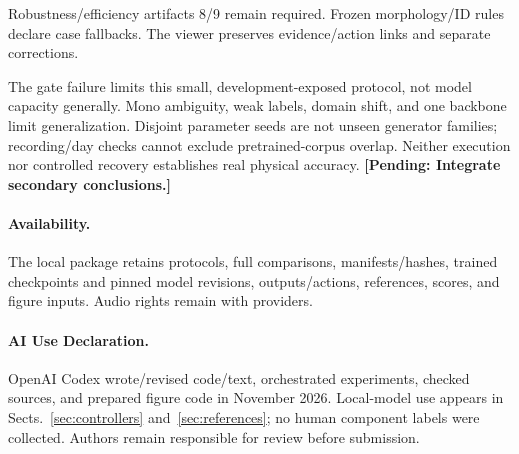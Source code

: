 \documentclass[runningheads,orivec]{llncs}
\newcommand{\pending}[1]{\iffinalresults
  \PackageError{research-results}{Unresolved result or protocol marker}{Resolve the marked item from recorded evidence before submission.}%
  \else\textbf{[Pending: #1]}\fi}
\newif\iffinalresults
\begin{document}
Robustness/efficiency artifacts 8/9 remain required. Frozen morphology/ID rules declare case fallbacks. The viewer preserves evidence/action links and separate corrections.

The gate failure limits this small, development-exposed protocol, not model capacity generally. Mono ambiguity, weak labels, domain shift, and one backbone limit generalization. Disjoint parameter seeds are not unseen generator families; recording/day checks cannot exclude pretrained-corpus overlap. Neither execution nor controlled recovery establishes real physical accuracy. \pending{Integrate secondary conclusions.}

\paragraph{Availability.} The local package retains protocols, full comparisons, manifests/hashes, trained checkpoints and pinned model revisions, outputs/actions, references, scores, and figure inputs. Audio rights remain with providers.

\paragraph{AI Use Declaration.} OpenAI Codex wrote/revised code/text, orchestrated experiments, checked sources, and prepared figure code in November 2026. Local-model use appears in Sects.~\ref{sec:controllers} and~\ref{sec:references}; no human component labels were collected. Authors remain responsible for review before submission.



\end{document}

